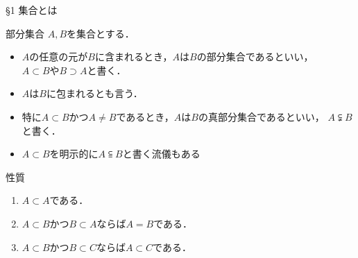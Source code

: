 \documentclass[uplatex,a4paper,dvipdfmx,aspectratio=169,11pt]{beamer}
\begin{document}
\begin{frame}[fragile]{\S 1 集合とは}
    \begin{block}{部分集合}
        $A, B$を集合とする．
        \begin{itemize}
            \item $A$の任意の元が$B$に含まれるとき，$A$は$B$の\alert{部分集合}であるといい，\\
                $A \subset B$や$B \supset A$と書く．
            \item $A$は$B$に\alert{包まれる}とも言う．
            \item 特に$A \subset B$かつ$A \neq B$であるとき，$A$は$B$の\alert{真部分集合}であるといい，
                $A \subsetneqq B$と書く．
        \end{itemize}
    \end{block}

    \begin{itemize}
        \item $A \subset B$を明示的に$A \subseteqq B$と書く流儀もある
    \end{itemize}

    \begin{block}{性質}
        \begin{enumerate}
            \item $A \subset A$である．
            \item $A \subset B$かつ$B \subset A$ならば$A = B$である．
            \item $A \subset B$かつ$B \subset C$ならば$A \subset C$である．
        \end{enumerate}
    \end{block}

\end{frame}

%
\end{document}
